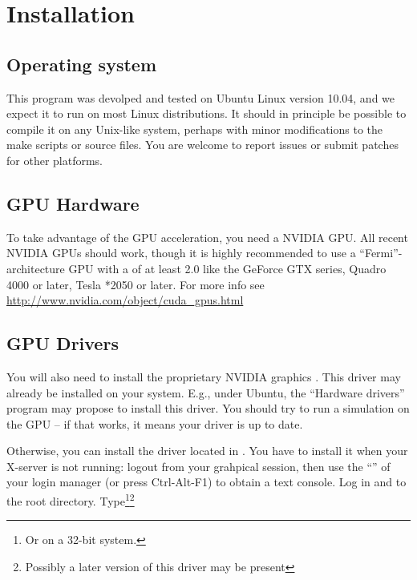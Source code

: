 \section{Installation}


\subsection{Operating system}

This program was devolped and tested on Ubuntu Linux version 10.04, and we expect it to run on most Linux distributions. It should in principle be possible to compile it on any Unix-like system, perhaps with minor modifications to the make scripts or source files. You are welcome to report issues or submit patches for other platforms.

\subsection{GPU Hardware}

To take advantage of the GPU acceleration, you need a  \textsc{NVIDIA} GPU. All recent \textsc{NVIDIA} GPUs should work, though it is highly recommended to use a ``Fermi''-architecture GPU with a  of at least 2.0 like the GeForce GTX series, Quadro 4000 or later, Tesla *2050 or later. For more info see \url{http://www.nvidia.com/object/cuda_gpus.html}

\subsection{GPU Drivers}

You will also need to install the proprietary \textsc{NVIDIA} graphics . This driver may already be installed on your system. E.g., under Ubuntu, the ``Hardware drivers'' program may propose to install this driver. You should try to run a simulation on the GPU -- if that works, it means your driver is up to date.

Otherwise, you can install the driver located in . You have to install it when your X-server is not running: logout from your grahpical session, then use the ``'' of your login manager (or press Ctrl-Alt-F1) to obtain a text console. Log in and  to  the \prog root directory. Type\footnote{Or  on a 32-bit system.}\footnote{Possibly a later version of this driver may be present}

